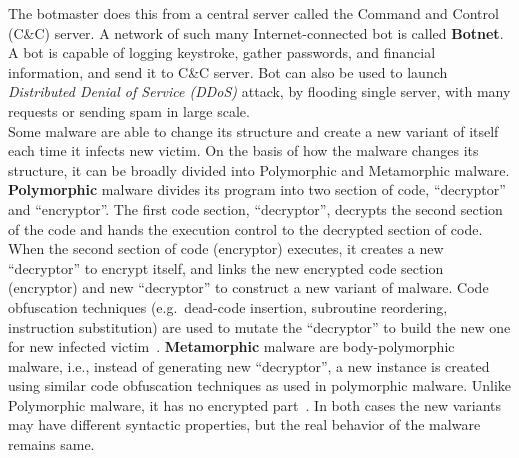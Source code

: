 The botmaster does this from a central server called the Command and Control (C\&C) server.
A network of such many Internet-connected bot is called \textbf{Botnet}.
A bot is capable of logging keystroke, gather passwords, and financial information, and send it to C\&C server.
Bot can also be used to launch \emph{Distributed Denial of Service (DDoS)} attack, by flooding single server, with many requests or sending spam in large scale.\\
Some malware are able to change its structure and create a new variant of itself each time it infects new victim.
On the basis of how the malware changes its structure, it can be broadly divided into Polymorphic and Metamorphic malware.
\textbf{Polymorphic} malware divides its program into two section of code, ``decryptor'' and ``encryptor''.
The first code section, ``decryptor'', decrypts the second section of the code and hands the execution control to the decrypted section of code.
When the second section of code (encryptor) executes, it creates a new ``decryptor'' to encrypt itself, and links the new encrypted code section (encryptor) and new ``decryptor'' to construct a new variant of malware.
Code obfuscation techniques (e.g.\ dead-code insertion, subroutine reordering, instruction substitution) are used to mutate the ``decryptor'' to build the new one for new infected victim~\cite[]{rad2011evolution}.
\textbf{Metamorphic} malware are body-polymorphic malware, i.e., instead of generating new ``decryptor'', a new instance is created using similar code obfuscation techniques as used in polymorphic malware.
Unlike Polymorphic malware, it has no encrypted part~\cite[]{rad2012camouflage}.
In both cases the new variants may have different syntactic properties, but the real behavior of the malware remains same.\\

